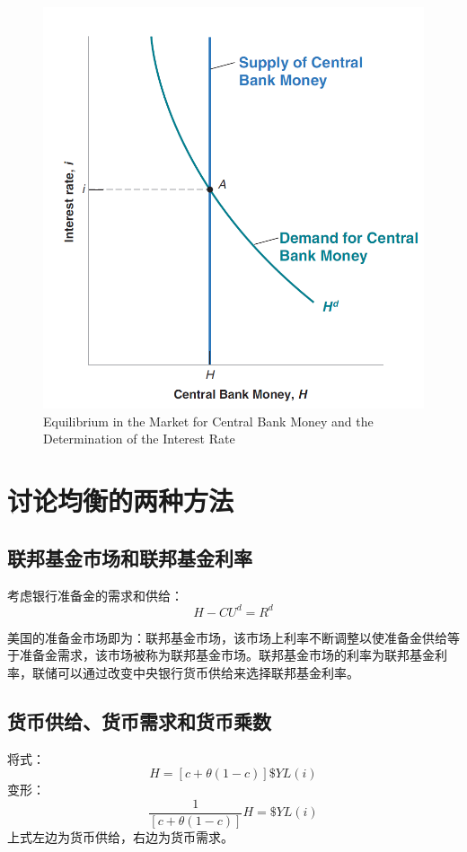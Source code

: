 \documentclass{article}
\begin{document}
\begin{figure}[H] %
	\centering %
	\includegraphics[width=1\textwidth]{4_2} %
	\caption{Equilibrium in the Market
		for Central Bank Money
		and the Determination of
		the Interest Rate} %
	\label{Fig.main3} %
\end{figure}

\section{讨论均衡的两种方法}
\subsection{联邦基金市场和联邦基金利率}
考虑银行准备金的需求和供给：
\[
H-CU^d=R^d
\]

美国的准备金市场即为：联邦基金市场，该市场上利率不断调整以使准备金供给等于准备金需求，该市场被称为联邦基金市场。联邦基金市场的利率为联邦基金利率，联储可以通过改变中央银行货币供给来选择联邦基金利率。

\subsection{货币供给、货币需求和货币乘数}
将式：
\[
H=[c+\theta(1-c)]\$YL(i)
\]
变形：
\[
\frac{1}{[c+\theta(1-c)]}H=\$YL(i)
\]
上式左边为货币供给，右边为货币需求。
\end{document}
